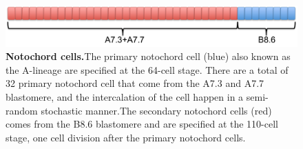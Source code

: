 \begin{figure}[tbp]
\centering
\includegraphics[scale=0.5]{figures/noto_cells.pdf}
\caption{\textbf{Notochord cells.}The primary notochord cell (blue) also known as the A-lineage are specified at the 64-cell stage. There are a total of 32 primary notochord cell that come from the A7.3 and A7.7 blastomere, and the intercalation of the cell happen in a semi-random stochastic manner.The secondary notochord cells (red) comes from the B8.6 blastomere and are specified at the 110-cell stage, one cell division after the primary notochord cells.}
\label{fig:noto_cells}
\end{figure}

